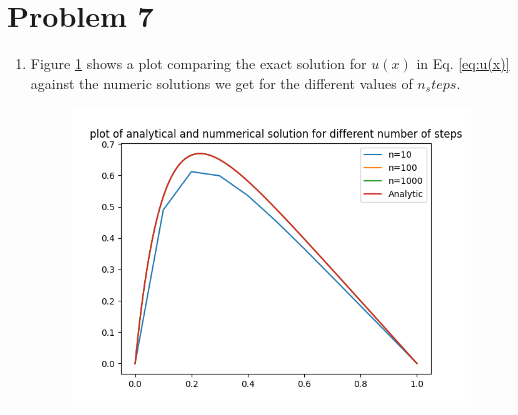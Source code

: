 \documentclass[english,notitlepage]{revtex4-1}  %
\begin{document}
\section*{Problem 7}
\begin{enumerate}[label= b)]
  \item Figure \ref{fig:analytical_compare} shows a plot comparing the exact solution for $u(x)$  in Eq. \ref{eq:u(x)} against the numeric solutions we get for the different values of $n_steps$.
  \begin{figure}[H]
    \centering
    \includegraphics[width=.7\textwidth]{../figures/analytical_compare.png}
    \caption{}
    \label{fig:analytical_compare}
  \end{figure}
\end{enumerate}
\end{document}
